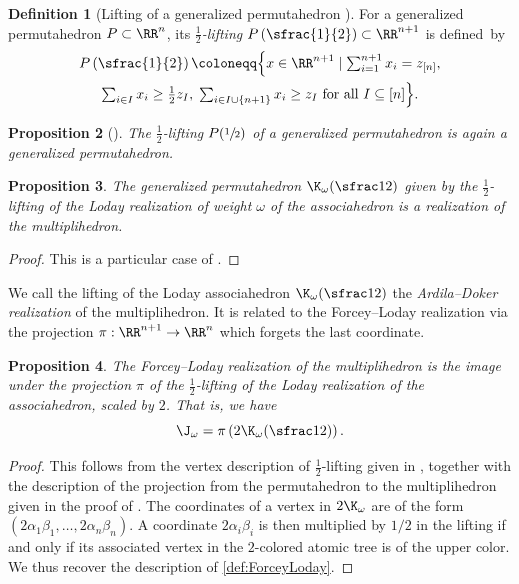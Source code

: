 \documentclass[JEP,XML,SOM,NoFloatCountersInSection,Unicode,published]{cedram}
\theoremstyle{definition}
\newtheorem{definition}{Definition}[section]
\theoremstyle{plain}
\newtheorem{proposition}[definition]{Proposition}
\begin{document}
\begin{definition}[Lifting of a generalized permutahedron {\cite[Def.\,2.3]{AD13}}]
For a generalized permutahedron $P\subset \RR^n$, its \emph{$\tfrac{1}{2}$-lifting} $P \left(\sfrac{1}{2}\right) \subset \RR^{n+1}$ is defined~by
\begin{multline*}
\textstyle
P \left(\sfrac{1}{2}\right) \coloneqq \Bigl\{ x \in \RR^{n+1} \mid
\sum_{i=1}^{n+1} x_i = z_{[n]},\\ \textstyle
\sum_{i \in I} x_i \geq \tfrac{1}{2}z_I,\;
\sum_{i \in I \cup \{n+1\}} x_i \geq z_I
\text{ for all } I \subseteq [n] \Bigr\}.
\end{multline*}
\end{definition}

\begin{proposition}[{\cite[Prop.\,2.4]{AD13}}]
The $\tfrac{1}{2}$-lifting $P (\sfrac12)$ of a generalized permutahedron is again a generalized permutahedron.
\end{proposition}

\begin{proposition}
The generalized permutahedron $\K_\omega(\sfrac12)$ given by the $\tfrac{1}{2}$-lifting of the Loday realization of weight $\omega$ of the associahedron is a realization of the multiplihedron.
\end{proposition}
\begin{proof}
This is a particular case of \cite[Cor.\,4.10]{AD13}.
\end{proof}

We call the lifting of the Loday associahedron $\K_\omega(\sfrac12)$ the\emph{ Ardila--Doker realization} of the multiplihedron. It is related to the Forcey--Loday realization via the projection $\pi: \RR^{n+1} \to \RR^n$ which forgets the last coordinate.

\begin{proposition}
\label{prop:lifting}
The Forcey--Loday realization of the multiplihedron is the image under the projection $\pi$ of the $\tfrac{1}{2}$-lifting of the Loday realization of the associahedron, scaled by $2$.
That is, we have
\[
\J_\omega = \pi \left(2 \K_\omega(\sfrac12)\right).
\]
\end{proposition}

\begin{proof}
This follows from the vertex description of $\tfrac{1}{2}$-lifting given in \cite[Def.\,3.5.3]{Doker11}, together with the description of the projection from the permutahedron to the multiplihedron given in the proof of \cite[Th.\,3.3.6]{Doker11}.
The coordinates of a vertex in $2 \K_\omega$ are of the form $(2\alpha_1\beta_1, \ldots, 2\alpha_n\beta_n)$.
A coordinate $2\alpha_i\beta_i$ is then multiplied by $1/2$ in the lifting if and only if its associated vertex in the $2$-colored atomic tree is of the upper color.
We thus recover the description of \cref{def:ForceyLoday}.
\end{proof}
\end{document}

